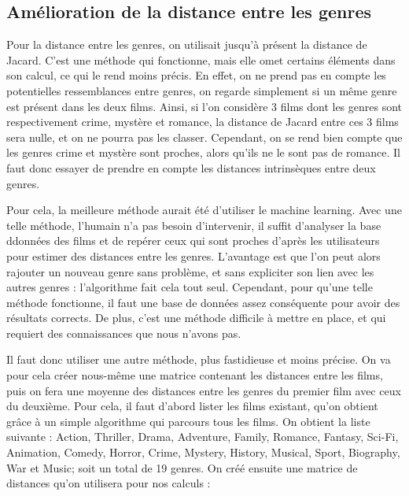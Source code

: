\documentclass[11pt,a4paper]{report}
\begin{document}
\subsection{Amélioration de la distance entre les genres}

Pour la distance entre les genres, on utilisait jusqu'à présent la distance de Jacard. C'est une méthode qui fonctionne, mais elle omet certains éléments dans son calcul, ce qui le rend moins précis. En effet, on ne prend pas en compte les potentielles ressemblances entre genres, on regarde simplement si un même genre est présent dans les deux films. Ainsi, si l'on considère 3 films dont les genres sont respectivement crime, mystère et romance, la distance de Jacard entre ces 3 films sera nulle, et on ne pourra pas les classer. Cependant, on se rend bien compte que les genres crime et mystère sont proches, alors qu'ils ne le sont pas de romance. Il faut donc essayer de prendre en compte les distances intrinsèques entre deux genres.\par
Pour cela, la meilleure méthode aurait été d'utiliser le machine learning. Avec une telle méthode, l'humain n'a pas besoin d'intervenir, il suffit d'analyser la base ddonnées des films et de repérer ceux qui sont proches d'après les utilisateurs pour estimer des distances entre les genres. L'avantage est que l'on peut alors rajouter un nouveau genre sans problème, et sans expliciter son lien avec les autres genres : l'algorithme fait cela tout seul. Cependant, pour qu'une telle méthode fonctionne, il faut une base de données assez conséquente pour avoir des résultats corrects. De plus, c'est une méthode difficile à mettre en place, et qui requiert des connaissances que nous n'avons pas.\par
Il faut donc utiliser une autre méthode, plus fastidieuse et moins précise. On va pour cela créer nous-même une matrice contenant les distances entre les films, puis on fera une moyenne des distances entre les genres du premier film avec ceux du deuxième. Pour cela, il faut d'abord lister les films existant, qu'on obtient grâce à un simple algorithme qui parcours tous les films. On obtient la liste suivante : Action, Thriller, Drama, Adventure, Family, Romance, Fantasy, Sci-Fi, Animation, Comedy, Horror, Crime, Mystery, History, Musical, Sport, Biography, War et Music; soit un total de 19 genres. On créé ensuite une matrice de distances qu'on utilisera pour nos calculs :
\setcounter{MaxMatrixCols}{20}
\small
\end{document}
